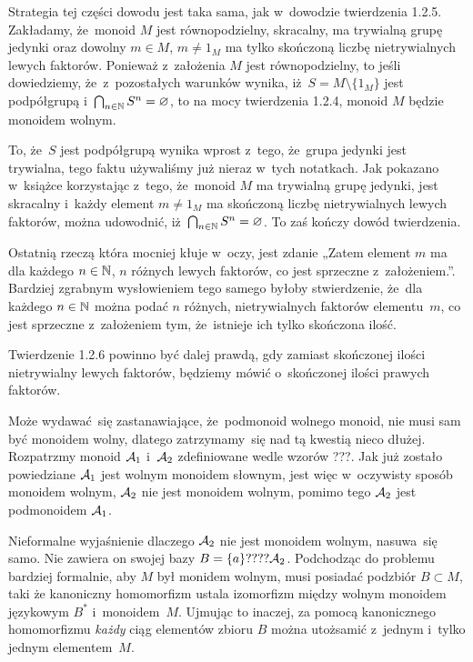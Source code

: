 \documentclass[a4paper,11pt]{article}
\begin{document}
Strategia tej części dowodu jest taka sama, jak w~dowodzie twierdzenia
1.2.5. Zakładamy, że~monoid $M$ jest równopodzielny, skracalny, ma
trywialną grupę jedynki oraz dowolny $m \in M$, $m \neq 1_{ M }$ ma tylko
skończoną liczbę nietrywialnych lewych faktorów. Ponieważ z~założenia $M$
jest równopodzielny, to jeśli dowiedziemy, że~z~pozostałych warunków
wynika, iż~$S = M \setminus \{ 1_{ M } \}$ jest podpółgrupą
i~$\bigcap_{ n \in \mathbb{N} } S^{ n } = \varnothing$, to na mocy twierdzenia 1.2.4, monoid $M$
będzie monoidem wolnym.

To, że~$S$ jest podpółgrupą wynika wprost z~tego, że~grupa jedynki jest
trywialna, tego faktu używaliśmy już nieraz w~tych notatkach. Jak pokazano
w~książce korzystając z~tego, że~monoid $M$ ma trywialną grupę jedynki,
jest skracalny i~każdy element $m \neq 1_{ M }$ ma skończoną liczbę
nietrywialnych lewych faktorów, można udowodnić,
iż~$\bigcap_{ n \in \mathbb{N} } S^{ n } = \varnothing$. To zaś kończy dowód twierdzenia.

Ostatnią rzeczą która mocniej kłuje w~oczy, jest zdanie „Zatem element $m$
ma dla każdego $n \in \mathbb{N}$, $n$ różnych lewych faktorów, co jest sprzeczne
z~założeniem.”. Bardziej zgrabnym wysłowieniem tego samego byłoby
stwierdzenie, że~dla każdego $n \in \mathbb{N}$ można podać $n$ różnych,
nietrywialnych faktorów elementu~$m$, co jest sprzeczne z~założeniem tym,
że~istnieje ich tylko skończona ilość.

\vspace{\spaceFour}




\start {} Twierdzenie 1.2.6 powinno być dalej prawdą, gdy zamiast
skończonej ilości nietrywialny lewych faktorów, będziemy mówić o~skończonej
ilości prawych faktorów.

\vspace{\spaceFour}





\start {} Może wydawać~się zastanawiające, że~podmonoid wolnego
monoid, nie musi sam być monoidem wolny, dlatego zatrzymamy~się nad tą
kwestią nieco dłużej. Rozpatrzmy monoid $\mathcal{A}_{ 1 }$ i~$\mathcal{A}_{ 2 }$
zdefiniowane wedle wzorów ???. Jak już zostało powiedziane $\mathcal{A}_{ 1 }$
jest wolnym monoidem słownym, jest więc w~oczywisty sposób monoidem wolnym,
$\mathcal{A}_{ 2 }$ nie jest monoidem wolnym, pomimo tego $\mathcal{A}_{ 2 }$ jest
podmonoidem $\mathcal{A}_{ 1 }$.

Nieformalne wyjaśnienie dlaczego $\mathcal{A}_{ 2 }$ nie jest monoidem wolnym,
nasuwa~się samo. Nie zawiera on swojej bazy $B = \{ a \} ???? \mathcal{A}_{ 2 }$.
Podchodząc do problemu bardziej formalnie, aby $M$ był monidem wolnym, musi
posiadać podzbiór $B \subset M$, taki że kanoniczny homomorfizm ustala
izomorfizm między wolnym monoidem językowym $B^{ * }$ i~monoidem~$M$.
Ujmując to inaczej, za pomocą kanonicznego homomorfizmu \textit{każdy} ciąg
elementów zbioru $B$ można utożsamić z~jednym i~tylko jednym elementem~$M$.
\end{document}

